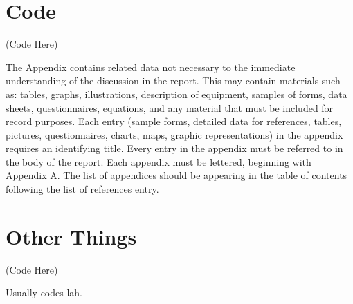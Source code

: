 
\begin{appendices}
\label{cha:appendixa}

\chapter{Code}
\begin{spacing}{1.5}

(Code Here)

The Appendix contains related data not necessary to the immediate understanding of the discussion in the report. This may contain materials such as: tables, graphs, illustrations, description of equipment, samples of forms, data sheets, questionnaires, equations, and any material that must be included for record purposes.
Each entry (sample forms, detailed data for references, tables, pictures, questionnaires, charts, maps, graphic representations) in the appendix requires an identifying title. Every entry in the appendix must be referred to in the body of the report. Each appendix must be lettered, beginning with Appendix A. The list of appendices should be appearing in the table of contents following the list of references entry.

\end{spacing}

\chapter{Other Things}
\begin{spacing}{1.5}
(Code Here)

Usually codes lah.

\end{spacing}
\end{appendices}
